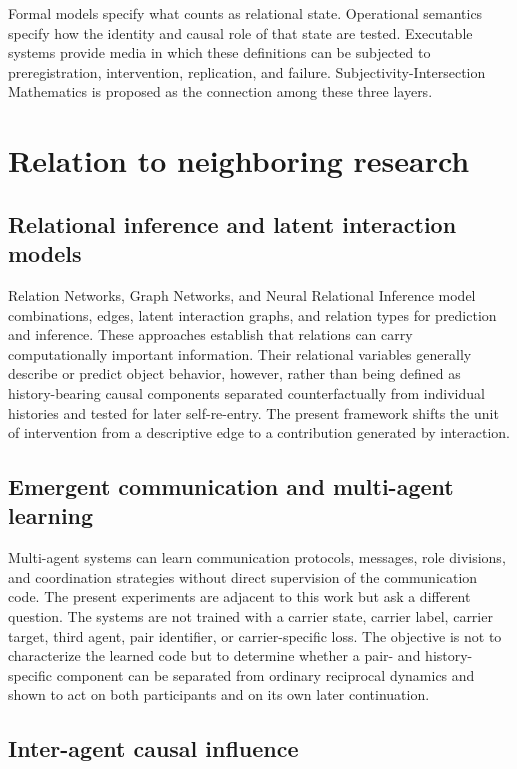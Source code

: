 \documentclass[11pt,a4paper]{article}
\begin{document}
Formal models specify what counts as relational state. Operational semantics specify how the identity and causal role of that state are tested. Executable systems provide media in which these definitions can be subjected to preregistration, intervention, replication, and failure. Subjectivity-Intersection Mathematics is proposed as the connection among these three layers.

\section{Relation to neighboring research}

\subsection{Relational inference and latent interaction models}

Relation Networks, Graph Networks, and Neural Relational Inference model combinations, edges, latent interaction graphs, and relation types for prediction and inference. These approaches establish that relations can carry computationally important information. Their relational variables generally describe or predict object behavior, however, rather than being defined as history-bearing causal components separated counterfactually from individual histories and tested for later self-re-entry. The present framework shifts the unit of intervention from a descriptive edge to a contribution generated by interaction.

\subsection{Emergent communication and multi-agent learning}

Multi-agent systems can learn communication protocols, messages, role divisions, and coordination strategies without direct supervision of the communication code. The present experiments are adjacent to this work but ask a different question. The systems are not trained with a carrier state, carrier label, carrier target, third agent, pair identifier, or carrier-specific loss. The objective is not to characterize the learned code but to determine whether a pair- and history-specific component can be separated from ordinary reciprocal dynamics and shown to act on both participants and on its own later continuation.

\subsection{Inter-agent causal influence}
\end{document}
